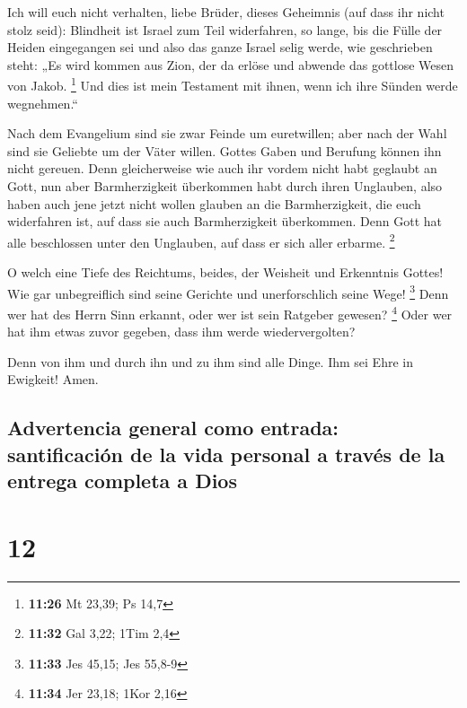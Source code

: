  Ich will euch nicht verhalten, liebe Brüder, dieses
Geheimnis (auf dass ihr nicht stolz seid): Blindheit ist Israel zum Teil
widerfahren, so lange, bis die Fülle der Heiden eingegangen sei
 und also das ganze Israel selig werde, wie geschrieben
steht: „Es wird kommen aus Zion, der da erlöse und abwende das gottlose
Wesen von Jakob. \footnote{\textbf{11:26} Mt 23,39; Ps 14,7}
 Und dies ist mein Testament mit ihnen, wenn ich ihre
Sünden werde wegnehmen.``

 Nach dem Evangelium sind sie zwar Feinde um euretwillen;
aber nach der Wahl sind sie Geliebte um der Väter willen.
 Gottes Gaben und Berufung können ihn nicht gereuen.
 Denn gleicherweise wie auch ihr vordem nicht habt
geglaubt an Gott, nun aber Barmherzigkeit überkommen habt durch ihren
Unglauben,  also haben auch jene jetzt nicht wollen
glauben an die Barmherzigkeit, die euch widerfahren ist, auf dass sie
auch Barmherzigkeit überkommen.  Denn Gott hat alle
beschlossen unter den Unglauben, auf dass er sich aller erbarme.
\footnote{\textbf{11:32} Gal 3,22; 1Tim 2,4}

 O welch eine Tiefe des Reichtums, beides, der Weisheit
und Erkenntnis Gottes! Wie gar unbegreiflich sind seine Gerichte und
unerforschlich seine Wege! \footnote{\textbf{11:33} Jes 45,15; Jes
  55,8-9}  Denn wer hat des Herrn Sinn erkannt, oder wer
ist sein Ratgeber gewesen? \footnote{\textbf{11:34} Jer 23,18; 1Kor 2,16}
 Oder wer hat ihm etwas zuvor gegeben, dass ihm werde
wiedervergolten?

 Denn von ihm und durch ihn und zu ihm sind alle Dinge.
Ihm sei Ehre in Ewigkeit! Amen.

\hypertarget{advertencia-general-como-entrada-santificaciuxf3n-de-la-vida-personal-a-travuxe9s-de-la-entrega-completa-a-dios}{%
\subsection{Advertencia general como entrada: santificación de la vida
personal a través de la entrega completa a
Dios}\label{advertencia-general-como-entrada-santificaciuxf3n-de-la-vida-personal-a-travuxe9s-de-la-entrega-completa-a-dios}}

\hypertarget{section-11}{%
\section{12}\label{section-11}}

